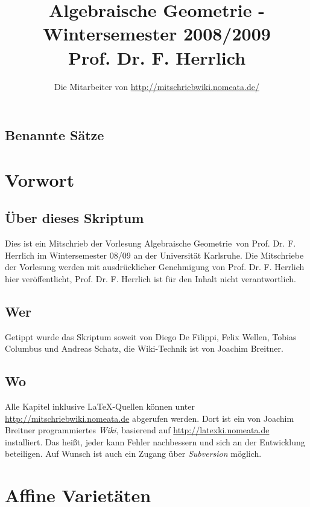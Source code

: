 \documentclass[a4paper,12pt]{report}
\title{Algebraische Geometrie - Wintersemester 2008/2009\\ Prof. Dr. F. Herrlich}
\author{Die Mitarbeiter von \url{http://mitschriebwiki.nomeata.de/}}
\theoremstyle{break}
\theoremstyle{nonumberbreak}
\theoremstyle{nonumberplain}
\begin{document}
\maketitle

\setlength\parskip{0.6pt}
\tableofcontents

\section*{Benannte Sätze}


\setlength\parskip{\smallskipamount}

\chapter{Vorwort}
\setcounter{secnumdepth}{2}
\section*{Über dieses Skriptum}
Dies ist ein Mitschrieb der Vorlesung \glqq Algebraische Geometrie\grqq\ von Prof. Dr. F. Herrlich im
Wintersemester 08/09 an der Universität Karlsruhe.
Die Mitschriebe der Vorlesung werden mit ausdrücklicher Genehmigung von Prof. Dr. F. Herrlich hier veröffentlicht,
Prof. Dr. F. Herrlich ist für  den Inhalt nicht verantwortlich.
\section*{Wer}
Getippt wurde das Skriptum soweit von Diego De Filippi, Felix Wellen, Tobias Columbus und Andreas Schatz, die Wiki-Technik ist von Joachim Breitner.

\section*{Wo}
Alle Kapitel inklusive \LaTeX-Quellen können unter \url{http://mitschriebwiki.nomeata.de} abgerufen werden.
Dort ist ein von Joachim Breitner programmiertes \emph{Wiki}, basierend auf \url{http://latexki.nomeata.de} installiert. 
Das heißt, jeder kann Fehler nachbessern und sich an der Entwicklung
beteiligen. Auf Wunsch ist auch ein Zugang über \emph{Subversion} möglich.


\chapter{Affine Varietäten}
\end{document}
